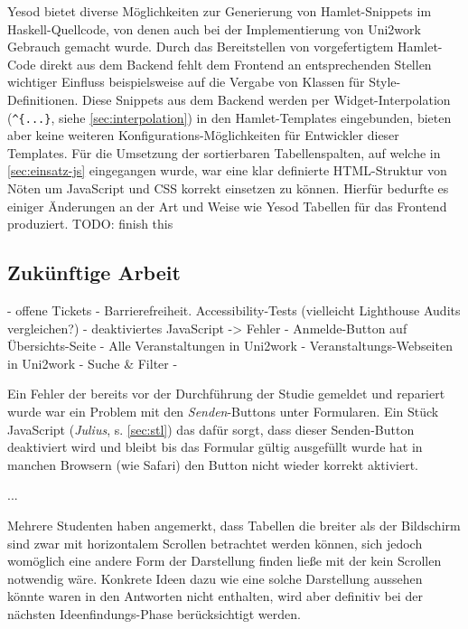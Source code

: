 \documentclass[11pt,a4paper,twoside,ngerman]{article}
\begin{document}
Yesod bietet diverse Möglichkeiten zur Generierung von Hamlet-Snippets im Haskell-Quellcode, von denen auch bei der Implementierung von Uni2work Gebrauch gemacht wurde. Durch das Bereitstellen von vorgefertigtem Hamlet-Code direkt aus dem Backend fehlt dem Frontend an entsprechenden Stellen wichtiger Einfluss beispielsweise auf die Vergabe von Klassen für Style-Definitionen. Diese Snippets aus dem Backend werden per Widget-Interpolation (\lstinline!^{...}!, siehe \autoref{sec:interpolation}) in den Hamlet-Templates eingebunden, bieten aber keine weiteren Konfigurations-Möglichkeiten für Entwickler dieser Templates. Für die Umsetzung der sortierbaren Tabellenspalten, auf welche in \autoref{sec:einsatz-js} eingegangen wurde, war eine klar definierte HTML-Struktur von Nöten um JavaScript und CSS korrekt einsetzen zu können. Hierfür bedurfte es einiger Änderungen an der Art und Weise wie Yesod Tabellen für das Frontend produziert. TODO: finish this

\subsection{Zukünftige Arbeit}

- offene Tickets
- Barrierefreiheit. Accessibility-Tests (vielleicht Lighthouse Audits vergleichen?)
- deaktiviertes JavaScript -> Fehler
- Anmelde-Button auf Übersichts-Seite
- Alle Veranstaltungen in Uni2work
- Veranstaltungs-Webseiten in Uni2work
- Suche & Filter
- 

Ein Fehler der bereits vor der Durchführung der Studie gemeldet und repariert wurde war ein Problem mit den \textit{Senden}-Buttons unter Formularen. Ein Stück JavaScript (\textit{Julius}, s. \autoref{sec:stl}) das dafür sorgt, dass dieser Senden-Button deaktiviert wird und bleibt bis das Formular gültig ausgefüllt wurde hat in manchen Browsern (wie Safari) den Button nicht wieder korrekt aktiviert.

...

Mehrere Studenten haben angemerkt, dass Tabellen die breiter als der Bildschirm sind zwar mit horizontalem Scrollen betrachtet werden können, sich jedoch womöglich eine andere Form der Darstellung finden ließe mit der kein Scrollen notwendig wäre. Konkrete Ideen dazu wie eine solche Darstellung aussehen könnte waren in den Antworten nicht enthalten, wird aber definitiv bei der nächsten Ideenfindungs-Phase berücksichtigt werden.

\end{document}
